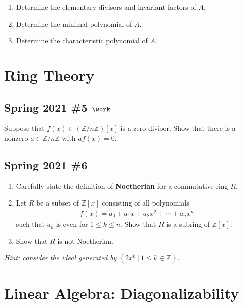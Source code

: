 \begin{enumerate}
\def\labelenumi{\alph{enumi}.}
\item
  Determine the elementary divisors and invariant factors of \(A\).
\item
  Determine the minimal polynomial of \(A\).
\item
  Determine the characteristic polynomial of \(A\).
\end{enumerate}

\hypertarget{ring-theory}{%
\section{Ring Theory}\label{ring-theory}}

\hypertarget{spring-2021-5-work}{%
\subsection{\texorpdfstring{Spring 2021 \#5
\(\work\)}{Spring 2021 \#5 \textbackslash work}}\label{spring-2021-5-work}}

Suppose that \(f(x) \in ({\mathbb{Z}}/n{\mathbb{Z}})[x]\) is a zero
divisor. Show that there is a nonzero
\(a\in {\mathbb{Z}}/n{\mathbb{Z}}\) with \(af(x) = 0\).

\hypertarget{spring-2021-6}{%
\subsection{Spring 2021 \#6}\label{spring-2021-6}}

\begin{enumerate}
\def\labelenumi{\alph{enumi}.}
\item
  Carefully state the definition of \textbf{Noetherian} for a
  commutative ring \(R\).
\item
  Let \(R\) be a subset of \({\mathbb{Z}}[x]\) consisting of all
  polynomials
  \begin{align*}
  f(x) = a_ 0 + a_1 x + a_2 x^2 + \cdots + a_nx^n
  \end{align*}
  such that \(a_k\) is even for \(1\leq k \leq n\). Show that \(R\) is a
  subring of \({\mathbb{Z}}[x]\).
\item
  Show that \(R\) is not Noetherian.
\end{enumerate}

\emph{Hint: consider the ideal generated by
\(\left\{{ 2x^k {~\mathrel{\Big|}~}1\leq k \in {\mathbb{Z}}}\right\}\).}

\hypertarget{linear-algebra-diagonalizability}{%
\section{Linear Algebra:
Diagonalizability}\label{linear-algebra-diagonalizability}}

